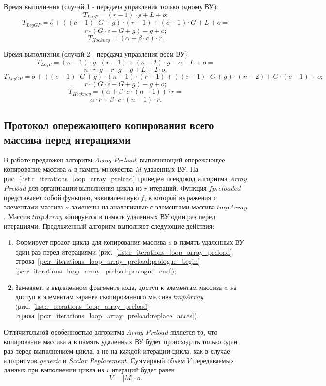 Время выполнения (случай 1 - передача управления только одному ВУ):
\[ T_{LogP} = (r - 1) \cdot g + L + o; \]
\[ T_{LogGP} =  o + ((c - 1) \cdot G + g) \cdot (r - 1) + (c - 1) \cdot G
+ L + o = \]
\[ r \cdot (G \cdot c - G + g) - g + o; \]
\[ T_{Hockney} = (\alpha + \beta \cdot c) \cdot r. \]

Время выполнения (случай 2 - передача управления всем ВУ):
\[ T_{LogP} = (n - 1) \cdot g \cdot (r - 1) + (n - 2) \cdot g + o + L + o = \]
\[ n \cdot r \cdot g - r \cdot g - g + L + 2 \cdot o; \]
\[ T_{LogGP} = o+((c-1) \cdot G + g) \cdot (n-1) \cdot (r-1) +
((c-1) \cdot G + g) \cdot (n - 2) + G \cdot (c-1) + o; \]
\[ r \cdot (G \cdot c - G + g) - g + o; \]
\[ T_{Hockney} = (\alpha + \beta \cdot c \cdot (n - 1)) \cdot r = \]
\[ \alpha \cdot r + \beta \cdot c \cdot (n - 1) \cdot r. \]

\subsection{Протокол опережающего копирования всего массива перед итерациями}
В работе предложен алгоритм \textit{Array Preload}, выполняющий опережающее
копирование массива $a$ в память множества $M$ удаленных ВУ. На
рис.~\ref{list:r_iterations_loop_array_preload} приведен псевдокод алгоритма
\textit{Array Preload} для организации выполнения цикла из $r$ итераций.
Функция $fpreloaded$  представляет собой функцию, эквивалентную $f$, в которой
выражения с элементами массива $a$ заменены на аналогичные с элементами
массива $tmpArray$. Массив $tmpArray$ копируется в память
удаленных ВУ один раз перед итерациями.
Предложенный алгоритм выполняет следующие действия:
\begin{enumerate}
\item Формирует пролог цикла для копирования массива $a$ в память удаленных ВУ
один раз перед итерациями (рис.~\ref{list:r_iterations_loop_array_preload}
строка~\ref{pc:r_iterations_loop_array_preload:prologue_begin}-
\ref{pc:r_iterations_loop_array_preload:prologue_end});
\item Заменяет, в выделенном фрагменте кода, доступ к элементам массива $a$ на
доступ к элементам заранее скопированного массива
$tmpArray$(рис.~\ref{list:r_iterations_loop_array_preload}
строка~\ref{pc:r_iterations_loop_array_preload:replace_acces}).
\end{enumerate}

Отличительной особенностью алгоритма \textit{Array Preload} является то, что
копирование массива $а$ в память удаленных ВУ будет происходить только один раз
перед выполнением цикла, а не на каждой итерации цикла, как в случае алгоритмов
\textit{generic} и \textit{Scalar Replacement}. Суммарный объем $V$ передаваемых
данных при выполнении цикла из $r$ итераций будет равен
\[ V= |M| \cdot d. \]

